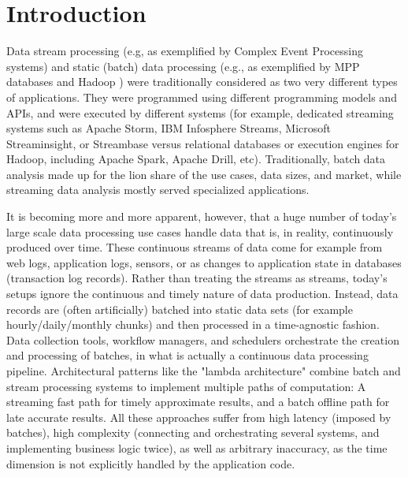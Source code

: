 

\section{Introduction}
\label{sec:intro}
Data stream processing (e.g, as exemplified by Complex Event Processing systems) and static (batch) data processing (e.g., as exemplified by MPP databases and Hadoop ) were traditionally considered as two very different types of applications. They were programmed using different programming models and APIs, and were executed by different systems (for example, dedicated streaming systems such as  Apache Storm, IBM Infosphere Streams, Microsoft Streaminsight, or Streambase versus relational databases or execution engines for Hadoop, including Apache Spark, Apache Drill, etc). Traditionally, batch data analysis made up for the lion share of the use cases, data sizes, and market, while streaming data analysis mostly served specialized applications.



It is becoming more and more apparent, however, that a huge number of today's large scale data processing use cases handle data that is, in reality, continuously produced over time. These continuous streams of data come for example from web logs, application logs, sensors, or as changes to application state in databases (transaction log records). Rather than treating the streams as streams, today's setups ignore the continuous and timely nature of data production. Instead, data records are (often artificially) batched into static data sets (for example hourly/daily/monthly chunks) and then processed in a time-agnostic fashion. Data collection tools, workflow managers, and schedulers orchestrate the creation and processing of batches, in what is actually a continuous data processing pipeline. Architectural patterns like the "lambda architecture" \cite{marz2015big} combine batch and stream processing systems to implement multiple paths of computation: A streaming fast path for timely approximate results, and a batch offline path for late accurate results. All these approaches suffer from high latency (imposed by batches), high complexity (connecting and orchestrating several systems, and implementing business logic twice), as well as arbitrary inaccuracy, as the time dimension is not explicitly handled by the application code.



